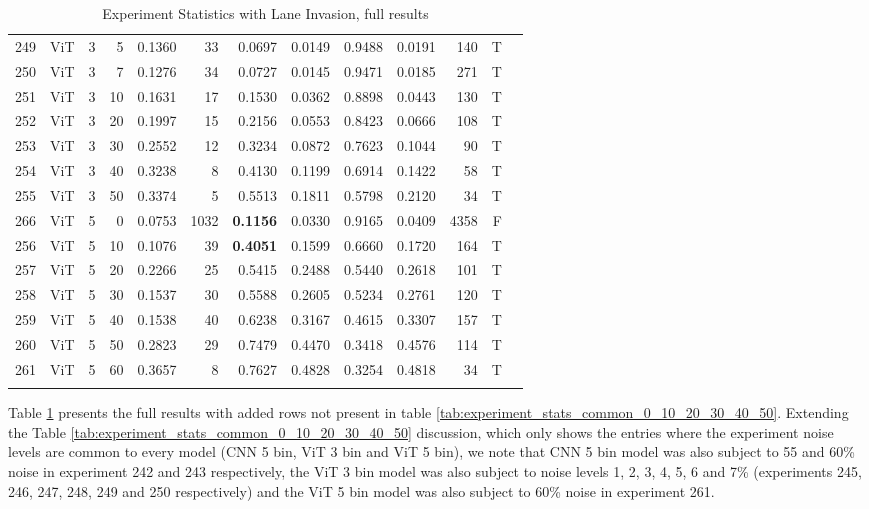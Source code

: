 \begin{longtable}{@{}cllrrrrrrrrrc@{}}
249 & ViT & 3 & 5 & 0.1360 & 33 & 0.0697 & 0.0149 & 0.9488 & 0.0191 & 140 & T \\
250 & ViT & 3 & 7 & 0.1276 & 34 & 0.0727 & 0.0145 & 0.9471 & 0.0185 & 271 & T \\
251 & ViT & 3 & 10 & 0.1631 & 17 & 0.1530 & 0.0362 & 0.8898 & 0.0443 & 130 & T \\
252 & ViT & 3 & 20 & 0.1997 & 15 & 0.2156 & 0.0553 & 0.8423 & 0.0666 & 108 & T \\
253 & ViT & 3 & 30 & 0.2552 & 12 & 0.3234 & 0.0872 & 0.7623 & 0.1044 & 90 & T \\
254 & ViT & 3 & 40 & 0.3238 & 8 & 0.4130 & 0.1199 & 0.6914 & 0.1422 & 58 & T \\
255 & ViT & 3 & 50 & 0.3374 & 5 & 0.5513 & 0.1811 & 0.5798 & 0.2120 & 34 & T \\
266 & ViT & 5 & 0 & 0.0753 & 1032 & \textbf{0.1156} & 0.0330 & 0.9165 & 0.0409 & 4358 & F \\
256 & ViT & 5 & 10 & 0.1076 & 39 & \textbf{0.4051} & 0.1599 & 0.6660 & 0.1720 & 164 & T \\
257 & ViT & 5 & 20 & 0.2266 & 25 & 0.5415 & 0.2488 & 0.5440 & 0.2618 & 101 & T \\
258 & ViT & 5 & 30 & 0.1537 & 30 & 0.5588 & 0.2605 & 0.5234 & 0.2761 & 120 & T \\
259 & ViT & 5 & 40 & 0.1538 & 40 & 0.6238 & 0.3167 & 0.4615 & 0.3307 & 157 & T \\
260 & ViT & 5 & 50 & 0.2823 & 29 & 0.7479 & 0.4470 & 0.3418 & 0.4576 & 114 & T \\
261 & ViT & 5 & 60 & 0.3657 & 8 & 0.7627 & 0.4828 & 0.3254 & 0.4818 & 34 & T \\
\bottomrule
\caption{Experiment Statistics with Lane Invasion, full results}
\label{tab:experiment_stats_full_0_10_20_30_40_50}
\end{longtable}

Table \ref{tab:experiment_stats_full_0_10_20_30_40_50} presents the full results with added rows not present in table \ref{tab:experiment_stats_common_0_10_20_30_40_50}. Extending the Table \ref{tab:experiment_stats_common_0_10_20_30_40_50} discussion, which only shows the entries where the experiment noise levels are common to every model (CNN 5 bin, ViT 3 bin and ViT 5 bin), we note that CNN 5 bin model was also subject to 55 and 60\% noise in experiment 242 and 243 respectively, the ViT 3 bin model was also subject to noise levels 1, 2, 3, 4, 5, 6 and 7\% (experiments 245, 246, 247, 248, 249 and 250 respectively) and the ViT 5 bin model was also subject to 60\% noise in experiment 261.

